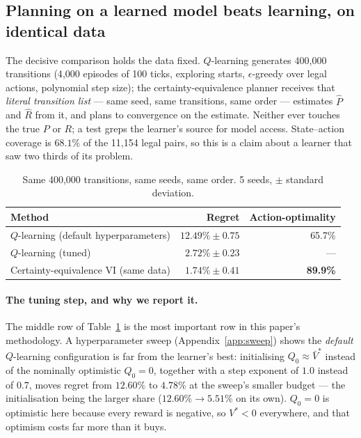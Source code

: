 \documentclass[11pt]{article}
\begin{document}
\subsection{Planning on a learned model beats learning, on identical data}

The decisive comparison holds the data fixed. $Q$-learning generates 400,000 transitions
(4{,}000 episodes of 100 ticks, exploring starts, $\epsilon$-greedy over legal actions, polynomial
step size); the certainty-equivalence planner receives that \emph{literal transition list} --- same
seed, same transitions, same order --- estimates $\hat{P}$ and $\hat{R}$ from it, and plans to
convergence on the estimate. Neither ever touches the true $P$ or $R$; a test greps the learner's
source for model access. State--action coverage is $68.1\%$ of the 11,154 legal pairs, so this
is a claim about a learner that saw two thirds of its problem.

\begin{table}[t]
\centering
\small
\caption{Same 400,000 transitions, same seeds, same order. 5 seeds, $\pm$ standard deviation.}
\label{tab:rl-ce}
\begin{tabular}{@{}lrr@{}}
\toprule
\textbf{Method} & \textbf{Regret} & \textbf{Action-optimality} \\
\midrule
$Q$-learning (default hyperparameters)      & $12.49\% \pm 0.75$ & 65.7\% \\
$Q$-learning (tuned)                        & $2.72\% \pm 0.23$  & --- \\
Certainty-equivalence VI (same data)        & $\mathbf{1.74\%} \pm 0.41$ & \textbf{89.9\%} \\
\bottomrule
\end{tabular}
\end{table}

\paragraph{The tuning step, and why we report it.} The middle row of Table~\ref{tab:rl-ce} is the
most important row in this paper's methodology. A hyperparameter sweep (Appendix~\ref{app:sweep})
shows the \emph{default} $Q$-learning configuration is far from the learner's best: initialising
$Q_0 \approx \bar{V}^{*}$ instead of the nominally optimistic $Q_0 = 0$, together with a step
exponent of $1.0$ instead of $0.7$, moves regret from $12.60\%$ to $4.78\%$ at the sweep's smaller
budget --- the initialisation being the larger share ($12.60\% \to 5.51\%$ on its own). $Q_0 = 0$ is
optimistic here because every reward is negative, so $V^{*} < 0$ everywhere, and that optimism costs
far more than it buys.
\end{document}
